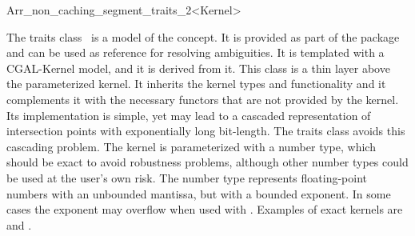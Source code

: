 \ccRefPageBegin
\begin{ccRefClass}{Arr_non_caching_segment_traits_2<Kernel>}
    
\ccDefinition 
  The traits class \ccRefName\ is a
  model of the  concept. It is provided as part of
  the package and can be used as reference for resolving ambiguities. 
  It is templated with a CGAL-Kernel model, and it is derived from it. This
  class is a thin layer above the parameterized kernel. It inherits the kernel
  types and functionality and it complements it with the necessary functors that
  are not provided by the kernel. Its implementation is simple, yet may lead to
  a cascaded representation of intersection points with exponentially long
  bit-length. The  traits class avoids this
  cascading problem. The kernel is parameterized with a number type, which
  should be exact to avoid robustness problems, although other number types
  could be used at the user's own risk. The  number
  type represents floating-point numbers with an unbounded mantissa, but with a
  bounded exponent. In some cases the exponent may overflow when used with
  . Examples of exact
  kernels are  and .
    
 
\ccIsModel

\end{ccRefClass}
\ccRefPageEnd

